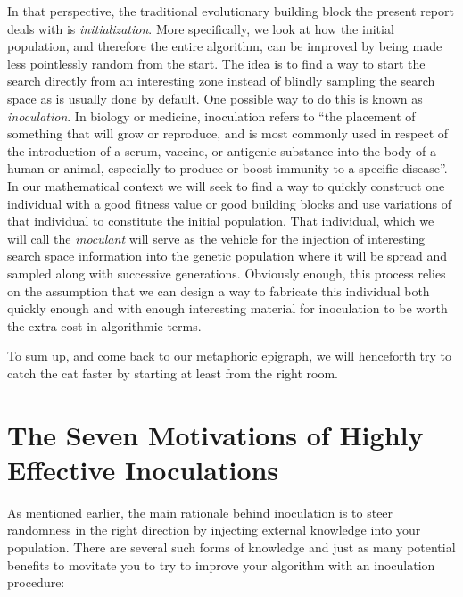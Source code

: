 \documentclass[english]{DESCARWINreport}
\begin{document}
In that perspective, the traditional evolutionary building block the present report deals with is \emph{initialization}. More specifically, we look at how the initial population, and therefore the entire algorithm, can be improved by being made less pointlessly random from the start. The idea is to find a way to start the search directly from an interesting zone instead of blindly sampling the search space as is usually done by default. One possible way to do this is known as \emph{inoculation}. In biology or medicine, inoculation refers to "`the placement of something that will grow or reproduce, and is most commonly used in respect of the introduction of a serum, vaccine, or antigenic substance into the body of a human or animal, especially to produce or boost immunity to a specific disease"'. In our mathematical context we will seek to find a way to quickly construct one individual with a good fitness value or good building blocks and use variations of that individual to constitute the initial population. That individual, which we will call the \emph{inoculant} will serve as the vehicle for the injection of interesting search space information into the genetic population where it will be spread and sampled along with successive generations.  Obviously enough, this process relies on the assumption that we can design a way to fabricate this individual both quickly enough and with enough interesting material for inoculation to be worth the extra cost in algorithmic terms.

To sum up, and come back to our metaphoric epigraph, we will henceforth try to catch the cat faster by starting at least from the right room.

\section{The Seven Motivations of Highly Effective Inoculations}


As mentioned earlier, the main rationale behind inoculation is to steer randomness in the right direction by injecting external knowledge into your population. There are several such forms of knowledge and just as many potential benefits to movitate you to try to improve your algorithm with an inoculation procedure:
\end{document}

